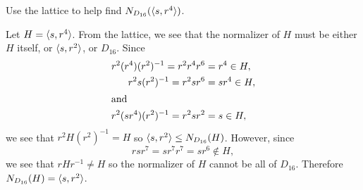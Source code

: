  Use the lattice to help find $N_{D_{16}}(\langle{s,r^4}\rangle)$.
\begin{solution}
  Let $H = \langle{s,r^4}\rangle$. From the lattice, we see that the normalizer
  of $H$ must be either $H$ itself, or $\langle{s,r^2}\rangle$, or
  $D_{16}$. Since
  \begin{align*}
    r^2(r^4)(r^2)^{-1} = r^2r^4r^6 &= r^4\in H, \\
    r^2s(r^2)^{-1} = r^2sr^6 &= sr^4\in H, \\
    \intertext{and}
    r^2(sr^4)(r^2)^{-1} = r^2sr^2 &= s\in H,
  \end{align*}
  we see that $r^2H(r^2)^{-1} = H$ so $\langle{s,r^2}\rangle\leq
  N_{D_{16}}(H)$. However, since
  \begin{equation*}
    rsr^7 = sr^7r^7 = sr^6 \not\in H,
  \end{equation*}
  we see that $rHr^{-1}\neq H$ so the normalizer of $H$ cannot be all
  of $D_{16}$. Therefore $N_{D_{16}}(H) = \langle{s,r^2}\rangle$.
\end{solution}

